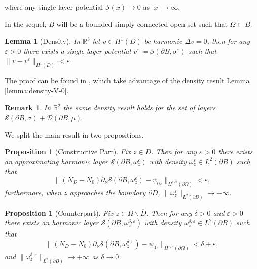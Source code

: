 \documentclass[10pt, a4paper, twoside, openright]{book}
\theoremstyle{definition}
\theoremstyle{plain}
\theoremstyle{plain}
\theoremstyle{plain}
\newtheorem{proposition}[subsection]{Proposition}
\theoremstyle{plain}
\newtheorem{remark}[subsection]{Remark}
\theoremstyle{plain}
\newtheorem{lemma}[subsection]{Lemma}
\theoremstyle{plain}
\theoremstyle{plain}
\theoremstyle{plain}
\let\epsilon\varepsilon
\begin{document}
 where any single layer potential $\mathcal{S}(x)\to0$ as $|x|\to \infty$.
 \par
 In the sequel, $B$ will be a bounded simply connected open set such that $\Omega\subset B$.
\begin{lemma}[Density]
 \label{lemma:lsm-density}
 In $\mathbb{R}^3$ let $v\in H^1(D)$ be harmonic $\Delta v=0$, then for any $\epsilon>0$ there exists 
 a single layer potential $v^\epsilon\coloneqq\mathcal{S}(\partial B, \sigma^\epsilon)$ such that $\|v-v^\epsilon\|_{H^1(D)}<\epsilon$.
\end{lemma}
The proof can be found in \cite{somersalo:preprint}, which take advantage of the density result Lemma \ref{lemma:density-V-0}.
\begin{remark}
 In $\mathbb{R}^2$ the same density result holds for the set of layers $\mathcal{S}(\partial B, \sigma)+ \mathcal{D}(\partial B,\mu)$.
\end{remark}
We split the main result in two propositions.
\begin{proposition}[Constructive Part]
\label{prop:lsm-constructive}
Fix $z \in D$. Then for any $\epsilon > 0$ there exists an approximating harmonic layer $\mathcal{S}(\partial B, \omega^\epsilon_z)$ with density $\omega^\epsilon_z\in L^2(\partial B)$  such that
\begin{equation}
 \|({N_D} - {N_0})\partial_\nu\mathcal{S}(\partial B, \omega^\epsilon_z) - \psi_{0z}\|_{H^{1/2}(\partial\Omega)} < \epsilon,
\end{equation}
furthermore, when $z$ approaches the boundary $\partial D$, $\|\omega^\epsilon_z\|_{L^2(\partial B)}\to + \infty$.
\end{proposition}
\begin{proposition}[Counterpart]
\label{prop:lsm-counterpart}
Fix $z \in \Omega\backslash\overline{D}$. Then for any $\delta>0$ and $\epsilon > 0$ there exists an harmonic layer $\mathcal{S}(\partial B, \omega^{\delta, \epsilon}_z)$ with density $\omega^{\delta, \epsilon}_z\in L^2(\partial B)$ such that
\begin{equation}
 \|({N_D} - {N_0})\partial_\nu\mathcal{S}(\partial B, \omega^{\delta,\epsilon}_z) - \psi_{0z}\|_{H^{1/2}(\partial\Omega)} < \delta + \epsilon,
\end{equation}
and $\|\omega^{\delta, \epsilon}_z\|_{L^2(\partial B)}\to + \infty$ as $\delta\to 0$.
\end{proposition}
\end{document}
